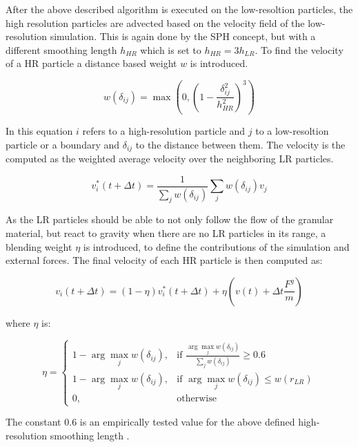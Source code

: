 \documentclass[intern]{cgMA}
\begin{document}
    After the above described algorithm is executed on the low-resoltion particles, the high resolution particles are advected based on the velocity field of the low-resolution simulation. This is again done by the SPH concept, but with a different smoothing length $h_{HR}$ which is set to $h_{HR} = 3h_{LR}$. To find the velocity of a HR particle a distance based weight $w$ is introduced.

    \begin{equation}
        w(\delta_{ij}) = \max(0, (1 - \frac{\delta_{ij}^2}{h_{HR}^2})^3)
    \end{equation}

    In this equation $i$ refers to a high-resolution particle and $j$ to a low-resoltion particle or a boundary and $\delta_{ij}$ to the distance between them. The velocity is the computed as the weighted average velocity over the neighboring LR particles.\cite{10.2312:PE:vriphys:vriphys12:053-060}

    \begin{equation}
        v_i^*(t + \Delta t) = \frac{1}{\sum_j w(\delta_{ij})}\sum_j w(\delta_{ij})v_j
    \end{equation}

    As the LR particles should be able to not only follow the flow of the granular material, but react to gravity when there are no LR particles in its range, a blending weight $\eta$ is introduced, to define the contributions of the simulation and external forces. The final velocity of each HR particle is then computed as:

    \begin{equation}
        v_i(t + \Delta t)  = (1 - \eta)v_i^*(t + \Delta t) + \eta(v(t) + \Delta t \frac{F^g}{m})
    \end{equation}

    where $\eta$ is:

    \begin{equation}
        \eta = 
        \begin{cases}
            1 - \arg \max_j w(\delta_{ij}),& \text{if } \frac{\arg \max_j w(\delta_{ij})}{\sum_j w(\delta_{ij})} \geq 0.6 \\
            1 - \arg \max_j w(\delta_{ij}),& \text{if } \arg \max_j w(\delta_{ij}) \leq w(r_{LR}) \\
            0,              & \text{otherwise}
        \end{cases}
    \end{equation}

    The constant $0.6$ is an empirically tested value for the above defined high-resolution smoothing length \cite{10.2312:PE:vriphys:vriphys12:053-060}. 
    
\end{document}
